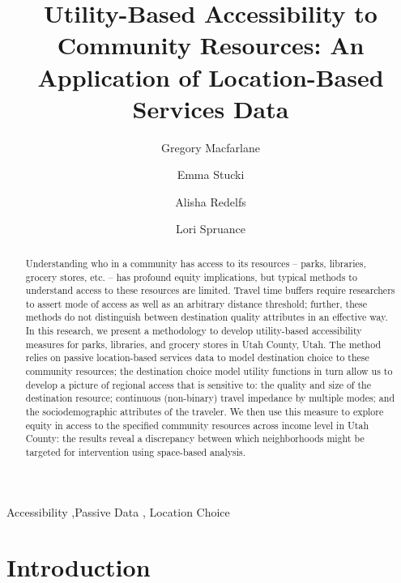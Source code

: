 \documentclass[3p, authoryear, review]{elsarticle} %
\begin{document}
\begin{frontmatter}

  \title{Utility-Based Accessibility to Community Resources: An Application of Location-Based Services Data}
    \author[BYU]{Gregory Macfarlane%
  }
    \author[BYU]{Emma Stucki%
  }
    \author[BYUPH]{Alisha Redelfs%
  }
    \author[BYUPH]{Lori Spruance%
  }
  
  \begin{abstract}
  Understanding who in a community has access to its resources -- parks, libraries,
  grocery stores, etc. -- has profound equity implications, but typical methods
  to understand access to these resources are limited. Travel time buffers require
  researchers to assert mode of access as well as an arbitrary distance threshold;
  further, these methods do not distinguish between destination quality attributes
  in an effective way. In this research, we present a methodology to develop
  utility-based accessibility measures for parks, libraries, and grocery stores
  in Utah County, Utah. The method relies on passive location-based services data
  to model destination choice to these community resources; the destination choice
  model utility functions in turn allow us to develop a picture of regional access
  that is sensitive to: the quality and size of the destination resource;
  continuous (non-binary) travel impedance by multiple modes; and the
  sociodemographic attributes of the traveler. We then use this measure
  to explore equity in access to the specified community resources across
  income level in Utah County: the results reveal a discrepancy between which
  neighborhoods might be targeted for intervention using space-based analysis.
  \end{abstract}
    \begin{keyword}
    Accessibility \sep Passive Data \sep 
    Location Choice
  \end{keyword}
  
 \end{frontmatter}

\hypertarget{intro}{%
\section{Introduction}\label{intro}}
\end{document}
